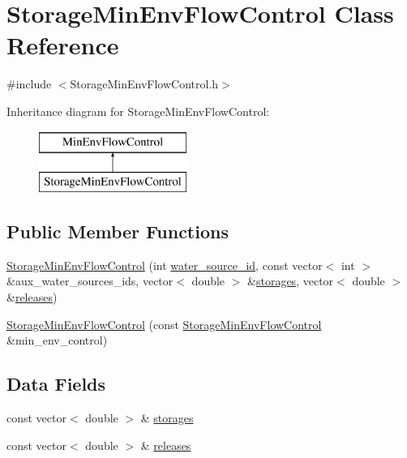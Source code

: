 \hypertarget{classStorageMinEnvFlowControl}{}\section{Storage\+Min\+Env\+Flow\+Control Class Reference}
\label{classStorageMinEnvFlowControl}


{\ttfamily \#include $<$Storage\+Min\+Env\+Flow\+Control.\+h$>$}

Inheritance diagram for Storage\+Min\+Env\+Flow\+Control\+:\begin{figure}[H]
\begin{center}
\leavevmode
\includegraphics[height=2.000000cm]{classStorageMinEnvFlowControl}
\end{center}
\end{figure}
\subsection*{Public Member Functions}
\begin{DoxyCompactItemize}
\item 
\mbox{\hyperlink{classStorageMinEnvFlowControl_aba965c28890bf5abb1230dd6d8879f18_aba965c28890bf5abb1230dd6d8879f18}{Storage\+Min\+Env\+Flow\+Control}} (int \mbox{\hyperlink{classMinEnvFlowControl_aada518a047598f386daec1d0358023aa_aada518a047598f386daec1d0358023aa}{water\+\_\+source\+\_\+id}}, const vector$<$ int $>$ \&aux\+\_\+water\+\_\+sources\+\_\+ids, vector$<$ double $>$ \&\mbox{\hyperlink{classStorageMinEnvFlowControl_af68170e5f561f1bfc2062f9e6ec8dd6d_af68170e5f561f1bfc2062f9e6ec8dd6d}{storages}}, vector$<$ double $>$ \&\mbox{\hyperlink{classStorageMinEnvFlowControl_af187563525a0b5b437d27134bff34646_af187563525a0b5b437d27134bff34646}{releases}})
\item 
\mbox{\hyperlink{classStorageMinEnvFlowControl_a2279f6d44b8ba69830a29654ddee8d3a_a2279f6d44b8ba69830a29654ddee8d3a}{Storage\+Min\+Env\+Flow\+Control}} (const \mbox{\hyperlink{classStorageMinEnvFlowControl}{Storage\+Min\+Env\+Flow\+Control}} \&min\+\_\+env\+\_\+control)
\end{DoxyCompactItemize}
\subsection*{Data Fields}
\begin{DoxyCompactItemize}
\item 
const vector$<$ double $>$ \& \mbox{\hyperlink{classStorageMinEnvFlowControl_af68170e5f561f1bfc2062f9e6ec8dd6d_af68170e5f561f1bfc2062f9e6ec8dd6d}{storages}}
\item 
const vector$<$ double $>$ \& \mbox{\hyperlink{classStorageMinEnvFlowControl_af187563525a0b5b437d27134bff34646_af187563525a0b5b437d27134bff34646}{releases}}
\end{DoxyCompactItemize}
